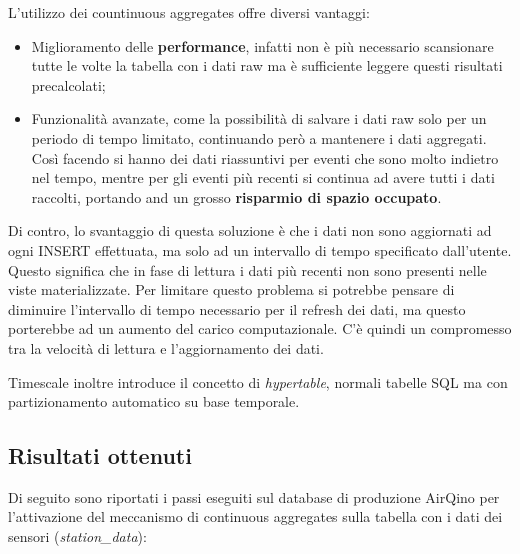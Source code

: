 L’utilizzo dei countinuous aggregates offre diversi vantaggi:
\begin{itemize}
  \item Miglioramento delle \textbf{performance}, infatti non è più necessario scansionare tutte le volte la tabella con i dati raw ma è sufficiente leggere questi risultati precalcolati;
  \item Funzionalità avanzate, come la possibilità di salvare i dati raw solo per un periodo di tempo limitato, continuando però a mantenere i dati aggregati. Così facendo si hanno dei dati riassuntivi per eventi che sono molto indietro nel tempo, mentre per gli eventi più recenti si continua ad avere tutti i dati raccolti, portando and un grosso \textbf{risparmio di spazio occupato}. \cite{tesi_polito_2}
\end{itemize}

Di contro, lo svantaggio di questa soluzione è che i dati non sono aggiornati ad ogni INSERT effettuata, ma solo ad un intervallo di tempo specificato dall’utente. Questo significa che in fase di lettura i dati più recenti non sono presenti nelle viste materializzate. Per limitare questo problema si potrebbe pensare di diminuire l’intervallo di tempo necessario per il refresh dei dati, ma questo porterebbe ad un aumento del carico computazionale. C'è quindi un compromesso tra la velocità di lettura e l’aggiornamento dei dati. \cite{tesi_polito_2}

Timescale inoltre introduce il concetto di \textit{hypertable}, normali tabelle SQL ma con partizionamento automatico su base temporale.

\subsection{Risultati ottenuti}\label{ssec:cont-aggr-risultati}
Di seguito sono riportati i passi eseguiti sul database di produzione AirQino per l'attivazione del meccanismo di continuous aggregates sulla tabella con i dati dei sensori (\textit{station\_data}):

